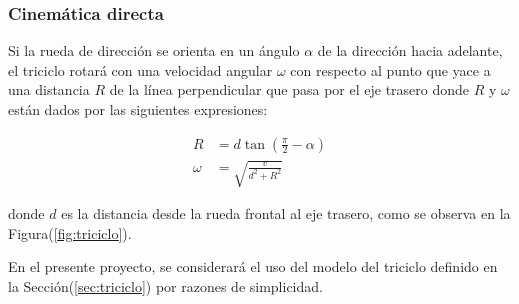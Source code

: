         \subsubsection{Cinemática directa}
        Si la rueda de dirección se orienta en un ángulo $\alpha$ de la dirección hacia adelante, el triciclo rotará con una 
        velocidad angular $\omega$ con respecto al punto que yace a una distancia $R$ de la línea perpendicular que pasa 
        por el eje trasero donde $R$ y $\omega$ están dados por las siguientes expresiones:

        \begin{align}
            R       &= d \tan(\frac{\pi}{2} - \alpha) \\
            \omega  &= \sqrt{\frac{v}{d^2 + R^2}}
        \end{align}

        donde $d$ es la distancia desde la rueda frontal al eje trasero, como se observa en la Figura(\ref{fig:triciclo}).

    
    En el presente proyecto, se considerará el uso del modelo del triciclo definido en la Sección(\ref{sec:triciclo}) 
    por razones de simplicidad.
